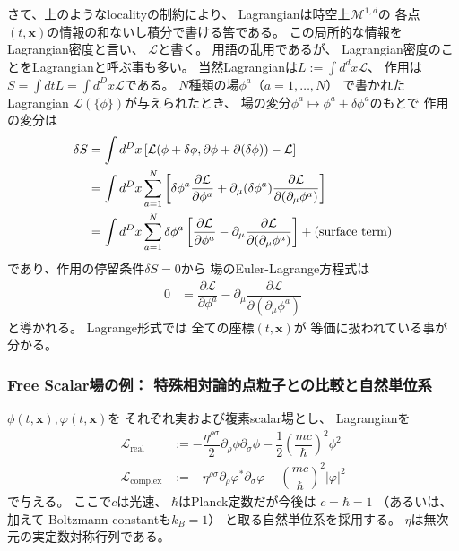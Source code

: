 さて、上のようなlocalityの制約により、
Lagrangianは時空上$\mathcal{M}^{1,d}$の
各点$(t, \bm{x})$の情報の和ないし積分で書ける筈である。
この局所的な情報をLagrangian密度と言い、
$\mathcal{L}$と書く。
用語の乱用であるが、
Lagrangian密度のことをLagrangianと呼ぶ事も多い。
当然Lagrangianは$L := \int d^d x \mathcal{L}$、
作用は$S= \int dt L = \int d^D x \mathcal{L}$である。
$N$種類の場$\phi^a$（$a = 1, \dots, N$）
で書かれたLagrangian
$\mathcal{L}(\{ \phi \})$が与えられたとき、
場の変分$\phi^a \mapsto
\phi^a + \delta \phi^a$のもとで
作用の変分は
\begin{align}
    \delta S
    &=
    \int d^D x
    \left[
        \mathcal{L}(\phi + \delta \phi ,
        \partial \phi + \partial (\delta \phi))
        - \mathcal{L}
    \right]
\notag\\&=
    \int d^D x
        \sum_{a = 1}^N
    \left[
        \delta \phi^a
        \dfrac{\partial \mathcal{L}}
            {\partial \phi^a}
        +
        \partial_\mu (\delta \phi^a)
        \dfrac{\partial \mathcal{L}}
            {\partial (\partial_\mu \phi^a)}
    \right]
\notag\\&=
    \int d^D x
        \sum_{a = 1}^N
    \delta \phi^a
    \left[
        \dfrac{\partial \mathcal{L}}
            {\partial \phi^a}
        -
        \partial_\mu
        \dfrac{\partial \mathcal{L}}
            {\partial (\partial_\mu \phi^a)}
    \right]
    + \text{(surface term)}
\end{align}
であり、作用の停留条件$\delta S = 0$から
場のEuler-Lagrange方程式は
\begin{align}
    0 &=
    \dfrac{\partial \mathcal{L}}
        {\partial \phi^a}
    -
    \partial_\mu
    \dfrac{\partial \mathcal{L}}
        {\partial (\partial_\mu \phi^a)}
\label{field EL eq}
\end{align}
と導かれる。
Lagrange形式では
全ての座標$(t, \bm{x})$が
等価に扱われている事が分かる。

\subsubsection{Free Scalar場の例：
    特殊相対論的点粒子との比較と自然単位系}

$\phi(t, \bm{x}), \varphi(t, \bm{x})$を
それぞれ実および複素scalar場とし、
Lagrangianを
\begin{align}
    \mathcal{L}_{\text{real}}
    &:=
    -
    \dfrac{ \eta^{\rho\sigma} }{2}
        \partial_\rho \phi
        \partial_\sigma \phi
    -
    \dfrac{1}{2}
    \left(
        \dfrac{m c}{\hbar}
    \right)^2
    \phi^2
\label{free real scalar lagrangian}
\\
    \mathcal{L}_{\text{complex}}
    &:=
    -
    \eta^{\rho\sigma}
        \partial_\rho \varphi^*
        \partial_\sigma \varphi
    -
    \left(
        \dfrac{m c}{\hbar}
    \right)^2
    |\varphi|^2
\label{free complex scalar lagrangian}
\end{align}
で与える。
ここで$c$は光速、
$\hbar$はPlanck定数だが今後は
$c = \hbar = 1$
（あるいは、加えて
Boltzmann constantも$k_B = 1$）
と取る自然単位系を採用する。
$\eta$は無次元の実定数対称行列である。

